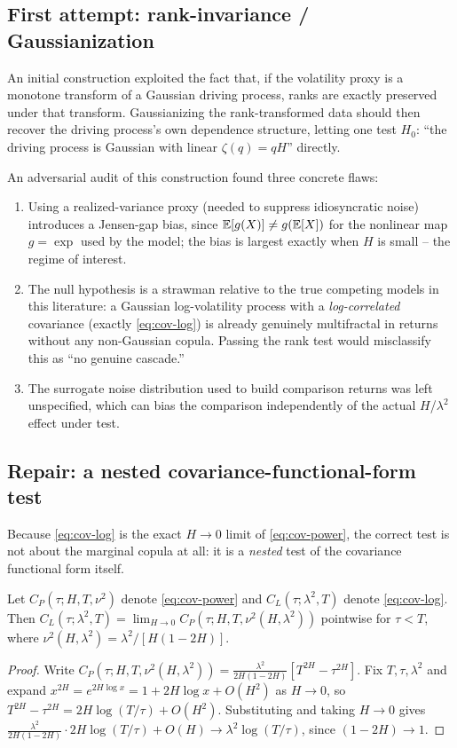 \documentclass[11pt]{article}
\begin{document}
\subsection{First attempt: rank-invariance / Gaussianization}

An initial construction exploited the fact that, if the volatility proxy is a monotone transform of a Gaussian driving process, ranks are exactly preserved under that transform. Gaussianizing the rank-transformed data should then recover the driving process's own dependence structure, letting one test $H_0$: ``the driving process is Gaussian with linear $\zeta(q)=qH$'' directly.

An adversarial audit of this construction found three concrete flaws:
\begin{enumerate}[label=(\alph*)]
\item Using a realized-variance proxy (needed to suppress idiosyncratic noise) introduces a Jensen-gap bias, since $\operatorname{\mathbb{E}}[g(X)] \ne g(\operatorname{\mathbb{E}}[X])$ for the nonlinear map $g=\exp$ used by the model; the bias is largest exactly when $H$ is small -- the regime of interest.
\item The null hypothesis is a strawman relative to the true competing models in this literature: a Gaussian log-volatility process with a \emph{log-correlated} covariance (exactly \eqref{eq:cov-log}) is already genuinely multifractal in returns without any non-Gaussian copula. Passing the rank test would misclassify this as ``no genuine cascade.''
\item The surrogate noise distribution used to build comparison returns was left unspecified, which can bias the comparison independently of the actual $H$/$\lambda^2$ effect under test.
\end{enumerate}

\subsection{Repair: a nested covariance-functional-form test}

Because \eqref{eq:cov-log} is the exact $H\to0$ limit of \eqref{eq:cov-power}, the correct test is not about the marginal copula at all: it is a \emph{nested} test of the covariance functional form itself.

\begin{proposition}
Let $C_P(\tau;H,T,\nu^2)$ denote \eqref{eq:cov-power} and $C_L(\tau;\lambda^2,T)$ denote \eqref{eq:cov-log}. Then $C_L(\tau;\lambda^2,T) = \lim_{H\to0} C_P(\tau;H,T,\nu^2(H,\lambda^2))$ pointwise for $\tau<T$, where $\nu^2(H,\lambda^2)=\lambda^2/[H(1-2H)]$.
\end{proposition}
\begin{proof}
Write $C_P(\tau;H,T,\nu^2(H,\lambda^2)) = \frac{\lambda^2}{2H(1-2H)}[T^{2H}-\tau^{2H}]$. Fix $T,\tau,\lambda^2$ and expand $x^{2H}=e^{2H\log x}=1+2H\log x+O(H^2)$ as $H\to0$, so $T^{2H}-\tau^{2H} = 2H\log(T/\tau)+O(H^2)$. Substituting and taking $H\to0$ gives $\frac{\lambda^2}{2H(1-2H)}\cdot 2H\log(T/\tau)+O(H) \to \lambda^2\log(T/\tau)$, since $(1-2H)\to1$.
\end{proof}
\end{document}
